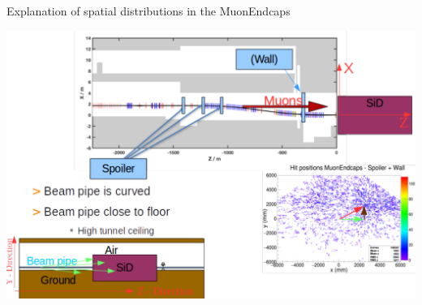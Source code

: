 \documentclass[xcolor={dvipsnames}]{beamer}
\begin{document}
\begin{frame}{Explanation of spatial distributions in the MuonEndcaps}
 \begin{center}
\includegraphics[height=0.85\textheight]{Explanation_Spatial_distribution.pdf}
\end{center}
\end{frame}
\end{document}
